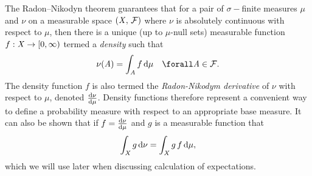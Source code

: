 The Radon--Nikodyn theorem guarantees that for a pair of $\sigma-$finite measures $\mu$ and $\nu$ on a measurable space $(\mathit{X},\,\mathcal{F})$ where $\nu$ is absolutely continuous with respect to $\mu$,  then there is a unique (up to $\mu$-null sets) measurable function $f : \mathit{X} \to [0,\infty)$ termed a \emph{density} such that
\begin{equation}\label{eq:radon-nikodym}
  \nu(\set{A}) = \int_{\set{A}} f\,\dr\mu
  \quad \forall \set{A} \in \sset{F}.
\end{equation}
The density function $f$ is also termed the \emph{Radon-Nikodym derivative} of $\nu$ with respect to $\mu$, denoted $\frac{\mathrm{d} \nu}{\mathrm{d} \mu}$. Density functions therefore represent a convenient way to define a probability measure with respect to an appropriate base measure. %
It can also be shown that if $f = \frac{\mathrm{d} \nu}{\mathrm{d} \mu}$ and  $g$ is a 	 measurable function that
\begin{equation}\label{eq:integral-wrt-density}
  \int_{\mathit{X}} g\,\mathrm{d}\nu = \int_{\mathit{X}} g\, f\,\mathrm{d}\mu,
\end{equation}
which we will use later when discussing calculation of expectations.

